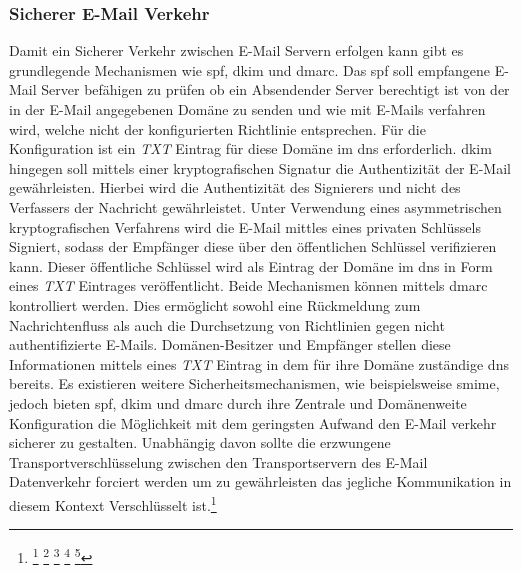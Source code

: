 \documentclass[11pt,a4paper,hidelinks]{article}   %
\begin{document}
            \subsubsection{Sicherer E-Mail Verkehr}
            Damit ein Sicherer Verkehr zwischen E-Mail Servern erfolgen kann gibt es grundlegende Mechanismen wie \gls{spf}, \gls{dkim} und \gls{dmarc}. Das \gls{spf} soll empfangene E-Mail Server befähigen zu prüfen ob ein Absendender Server berechtigt ist von der in der E-Mail angegebenen Domäne zu senden und wie mit E-Mails verfahren wird, welche nicht der konfigurierten Richtlinie entsprechen. Für die Konfiguration ist ein \emph{TXT} Eintrag für diese Domäne im \gls{dns} erforderlich. \gls{dkim} hingegen soll mittels einer kryptografischen Signatur die Authentizität der E-Mail gewährleisten. Hierbei wird die Authentizität des Signierers und nicht des Verfassers der Nachricht gewährleistet. Unter Verwendung eines asymmetrischen kryptografischen Verfahrens wird die E-Mail mittles eines privaten Schlüssels Signiert, sodass der Empfänger diese über den öffentlichen Schlüssel verifizieren kann. Dieser öffentliche Schlüssel wird als Eintrag der Domäne im \gls{dns} in Form eines \emph{TXT} Eintrages veröffentlicht. Beide Mechanismen können mittels \gls{dmarc} kontrolliert werden. Dies ermöglicht sowohl eine Rückmeldung zum Nachrichtenfluss als auch die Durchsetzung von Richtlinien gegen nicht authentifizierte E-Mails. Domänen-Besitzer und Empfänger stellen diese Informationen mittels eines \emph{TXT} Eintrag in dem für ihre Domäne zuständige \gls{dns} bereits. Es existieren weitere Sicherheitsmechanismen, wie beispielsweise \gls{smime}, jedoch bieten \gls{spf}, \gls{dkim} und \gls{dmarc} durch ihre Zentrale und Domänenweite Konfiguration die Möglichkeit mit dem geringsten Aufwand den E-Mail verkehr sicherer zu gestalten. Unabhängig davon sollte die erzwungene Transportverschlüsselung zwischen den Transportservern des E-Mail Datenverkehr forciert werden um zu gewährleisten das jegliche Kommunikation in diesem Kontext Verschlüsselt ist.\footnote{
                \footcite[Vgl. S. 5, 11 - 12][]{RFC7208}
                \footcite[Vgl. S. 4][1]{RFC6376}
                \footcite[Vgl. S. 12 und 15][]{RFC5585}
                \footcite[Vgl. S. 5][]{RFC8551}
                \footcite[Vgl. S. 4][]{RFC8689}
            }
\end{document}
